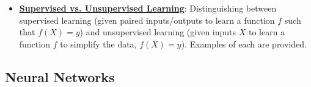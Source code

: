 \documentclass{article}%
\begin{document}
\begin{itemize}[leftmargin=*]
\item \href{https://purdue.brightspace.com/d2l/common/assets/pdfjs-d2l-dist/1.0.14-legacy/web/viewer.html?file=\%2Fcontent\%2Fenforced\%2F1095467-wl.202510.CS.24300.001\%2F12L2-distance-clusters.pdf\%3Fou\%3D1095467\&lang=en-us\&container=d2l-fileviewer-rendered-pdf\&fullscreen=d2l-fileviewer-rendered-pdf-dialog\&height=667#page=3}{\textbf{Supervised vs. Unsupervised Learning}}: Distinguishing between supervised learning (given paired inputs/outputs to learn a function $f$ such that $f(X) = y$) and unsupervised learning (given inputs $X$ to learn a function $f$ to simplify the data, $f(X) = y$). Examples of each are provided.%
\end{itemize}

%
\subsection{Neural Networks}%
\label{subsec:NeuralNetworks}%
\end{document}
